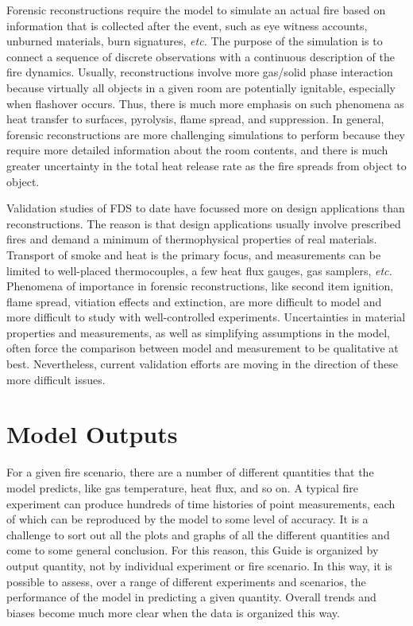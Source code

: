 Forensic reconstructions require the  model to simulate an actual fire
based on  information that is collected  after the event,  such as eye
witness accounts, unburned materials,  burn signatures, {\em etc.} The
purpose  of  the simulation  is  to  connect  a sequence  of  discrete
observations  with  a continuous  description  of  the fire  dynamics.
Usually,  reconstructions  involve  more gas/solid  phase  interaction
because  virtually  all  objects  in  a  given  room  are  potentially
ignitable, especially when flashover  occurs. Thus, there is much more
emphasis on  such phenomena as  heat transfer to  surfaces, pyrolysis,
flame  spread, and suppression.  In general,  forensic reconstructions
are more challenging simulations  to perform because they require more
detailed  information  about the  room  contents,  and  there is  much
greater uncertainty in the total heat release rate as the fire spreads
from object to object.

Validation  studies  of FDS  to  date  have  focussed more  on  design
applications   than  reconstructions.  The   reason  is   that  design
applications usually involve prescribed  fires and demand a minimum of
thermophysical properties  of real materials.  Transport  of smoke and
heat  is  the  primary  focus,  and measurements  can  be  limited  to
well-placed thermocouples, a few  heat flux gauges, gas samplers, {\em
etc.} Phenomena of importance in forensic reconstructions, like second
item  ignition, flame  spread, vitiation  effects and  extinction, are
more   difficult  to   model  and   more  difficult   to   study  with
well-controlled experiments. Uncertainties  in material properties and
measurements, as  well as simplifying assumptions in  the model, often
force the  comparison between model and measurement  to be qualitative
at best.  Nevertheless, current validation  efforts are moving  in the
direction of these more difficult issues.




\section{Model Outputs}

For a given fire scenario, there are a number of different quantities that the model predicts, like gas temperature, heat flux, and so on. A typical
fire experiment can produce hundreds of time histories of point measurements, each of which can be reproduced by the model to some level of accuracy.
It is a challenge to sort out all the plots and graphs of all the different quantities and come to some general conclusion. For this reason, this Guide
is organized by output quantity, not by individual experiment or fire scenario. In this way, it is possible to assess, over a range of different experiments
and scenarios, the performance of the model in predicting a given quantity. Overall trends and biases become much more clear when the data is organized this way.




